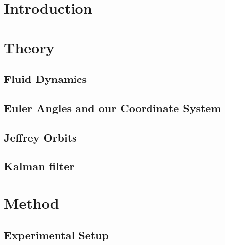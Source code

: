 \documentclass[]{report}
\begin{document}




\setcounter{page}{1}
\pagestyle{fancy}
\setspecialhdr
\tableofcontents


\newpage
\setdefaulthdr
{}	
\setcounter{page}{1}

\chapter{Introduction}



\chapter{Theory}


\section{Fluid Dynamics}


\section{Euler Angles and our Coordinate System}


\section{Jeffrey Orbits}

\section{Kalman filter}


\chapter{Method}

\section{Experimental Setup}

\end{document}
